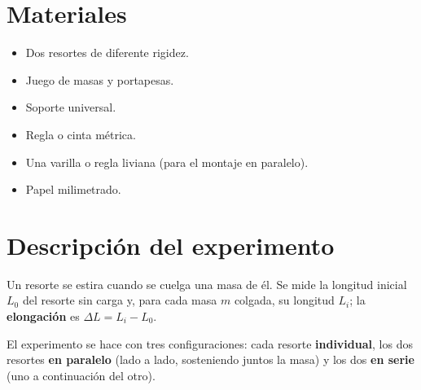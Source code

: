 \documentclass[11pt, letterpaper]{article}
\begin{document}
	\section{Materiales}
	\begin{itemize}
		\item Dos resortes de diferente rigidez.
		\item Juego de masas y portapesas.
		\item Soporte universal.
		\item Regla o cinta métrica.
		\item Una varilla o regla liviana (para el montaje en paralelo).
		\item Papel milimetrado.
	\end{itemize}
	
	\section{Descripción del experimento}
	
	Un resorte se estira cuando se cuelga una masa de él. Se mide la longitud
	inicial $L_0$ del resorte sin carga y, para cada masa $m$ colgada, su
	longitud $L_i$; la \textbf{elongación} es $\Delta L = L_i - L_0$.
	
	\vspace{0.1cm}
	\noindent
	El experimento se hace con tres configuraciones: cada resorte
	\textbf{individual}, los dos resortes \textbf{en paralelo} (lado a lado,
	sosteniendo juntos la masa) y los dos \textbf{en serie} (uno a continuación
	del otro).
	
\end{document}
